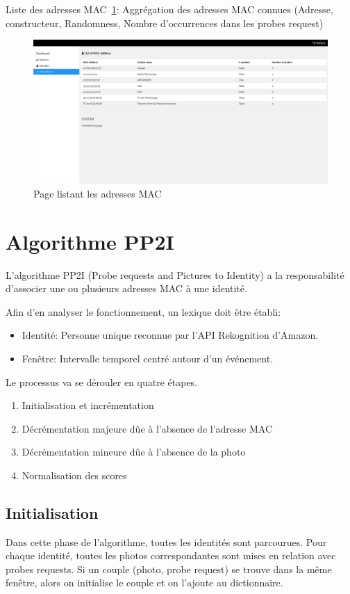 Liste des adresses MAC~\ref{fig:list_mac}: Aggrégation des adresses MAC connues (Adresse, constructeur, Randomness, Nombre d'occurrences dans les probes request)
\begin{figure}[H]
	\centering
	\includegraphics[width=16cm]{images/dashboard/list-macs.png}
	\caption{Page listant les adresses MAC}
	\label{fig:list_mac}
\end{figure}

\section{Algorithme PP2I}
L'algorithme PP2I (Probe requests and Pictures to Identity) a la responsabilité d'associer une ou plusieurs adresses MAC à une identité. 

Afin d'en analyser le fonctionnement, un lexique doit être établi:
\begin{itemize}
	\item Identité: Personne unique reconnue par l'API Rekognition d'Amazon.
	\item Fenêtre: Intervalle temporel centré autour d'un événement. 
\end{itemize}

Le processus va se dérouler en quatre étapes. 
\begin{enumerate}
	\item Initialisation et incrémentation
	\item Décrémentation majeure dûe à l'absence de l'adresse MAC
	\item Décrémentation mineure dûe à l'absence de la photo
	\item Normalisation des scores
\end{enumerate}

\subsection{Initialisation}
Dans cette phase de l'algorithme, toutes les identités sont parcourues.
Pour chaque identité, toutes les photos correspondantes sont mises en relation avec probes requests.
Si un couple (photo, probe request) se trouve dans la même fenêtre, alors on initialise le couple et on l'ajoute au dictionnaire.

